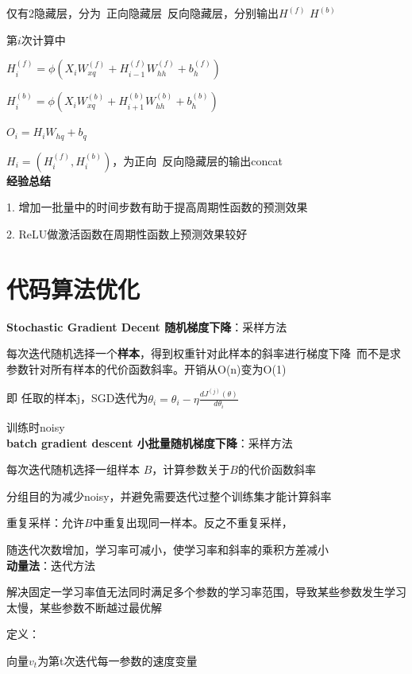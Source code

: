 \documentclass[UTF8]{ctexart}
\begin{document}
  \quad 仅有2隐藏层，分为\ 正向隐藏层\ 反向隐藏层，分别输出$H^{(f)}$ $H^{(b)}$

  \quad 第$i$次计算中

  \quad \quad $H_i^{(f)} = \phi (X_iW_{xq}^{(f)} + H_{i-1}^{(f)}W_{hh}^{(f)} + b_h^{(f)})$

  \quad \quad $H_i^{(b)} = \phi (X_iW_{xq}^{(b)} + H_{i+1}^{(b)}W_{hh}^{(b)} + b_h^{(b)})$

  \quad \quad $O_i = H_iW_{hq} + b_q$

  \quad \quad \quad $H_i = (H_i^{(f)}, H_i^{(b)})$，为正向\ 反向隐藏层的输出concat\\
\textbf{经验总结}

  1. 增加一批量中的时间步数有助于提高周期性函数的预测效果

  2. ReLU做激活函数在周期性函数上预测效果较好


\section{代码算法优化}
\noindent \textbf{Stochastic Gradient Decent 随机梯度下降}：采样方法

  每次迭代随机选择一个\textbf{样本}，得到权重针对此样本的斜率进行梯度下降\ 而不是求参数针对所有样本的代价函数斜率。开销从O(n)变为O(1)

  \quad 即 任取的样本j，SGD迭代为$\theta_i = \theta_i - \eta \frac{d J^{(j)}(\theta)}{d \theta_i}$
  
  \quad 训练时noisy\\
\textbf{batch gradient descent 小批量随机梯度下降}：采样方法

  每次迭代随机选择一组样本 $B$，计算参数关于$B$的代价函数斜率

  \quad 分组目的为减少noisy，并避免需要迭代过整个训练集才能计算斜率

  重复采样：允许$B$中重复出现同一样本。反之不重复采样，

  随迭代次数增加，学习率可减小，使学习率和斜率的乘积方差减小\\
\textbf{动量法}：迭代方法

  解决固定一学习率值无法同时满足多个参数的学习率范围，导致某些参数发生学习太慢，某些参数不断越过最优解

  定义：
  
  \quad 向量$v_t$为第t次迭代每一参数的速度变量
\end{document}
